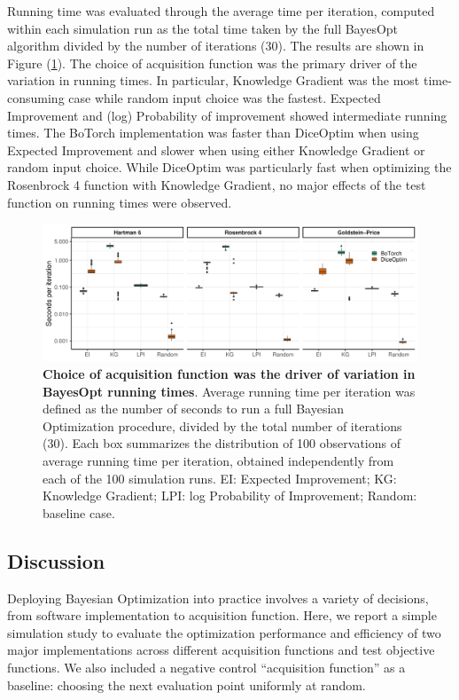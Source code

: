 Running time was evaluated through the average time per iteration, computed within each simulation run as the total time taken by the full BayesOpt algorithm divided by the number of iterations (30). The results are shown in Figure (\ref{fig:runtime}). The choice of acquisition function was the primary driver of the variation in running times. In particular, Knowledge Gradient was the most time-consuming case while random input choice was the fastest. Expected Improvement and (log) Probability of improvement showed intermediate running times. The BoTorch implementation was faster than DiceOptim when using Expected Improvement and slower when using either Knowledge Gradient or random input choice. While DiceOptim was particularly fast when optimizing the Rosenbrock 4 function with Knowledge Gradient, no major effects of the test function on running times were observed.

\begin{figure}[H]
\includegraphics[width=0.99\linewidth]{output/runtime_results.png}
\caption{\small \textbf{Choice of acquisition function was the driver of variation in BayesOpt running times}. Average running time per iteration was defined as the number of seconds to run a full Bayesian Optimization procedure, divided by the total number of iterations (30). Each box summarizes the distribution of 100 observations of average running time per iteration, obtained independently from each of the 100 simulation runs. EI: Expected Improvement; KG: Knowledge Gradient; LPI: log Probability of Improvement; Random: baseline case.}
\label{fig:runtime}
\end{figure}

\subsection{Discussion}

Deploying Bayesian Optimization into practice involves a variety of decisions, from software implementation to acquisition function. Here, we report a simple simulation study to evaluate the optimization performance and efficiency of two major implementations across different acquisition functions and test objective functions. We also included a negative control ``acquisition function'' as a baseline: choosing the next evaluation point uniformly at random.

